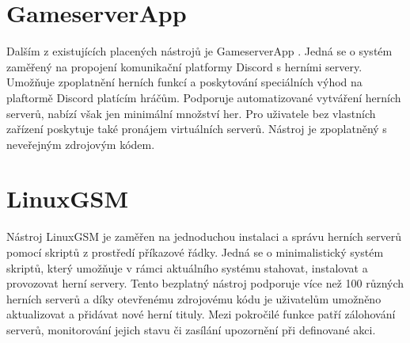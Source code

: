 \section{GameserverApp}

Dalším z existujících placených nástrojů je GameserverApp \cite{gameserverapp}. Jedná se o systém zaměřený na propojení komunikační platformy Discord s herními servery.
Umožňuje zpoplatnění herních funkcí a poskytování speciálních výhod na plaftormě Discord platícím hráčům. Podporuje automatizované vytváření herních serverů, nabízí však jen
minimální množství her. Pro uživatele bez vlastních zařízení poskytuje také pronájem virtuálních serverů. Nástroj je zpoplatněný s neveřejným zdrojovým kódem.

\section{LinuxGSM}

Nástroj LinuxGSM \cite{linuxgsm} je zaměřen na jednoduchou instalaci a správu herních serverů pomocí skriptů z prostředí příkazové řádky.
Jedná se o minimalistický systém skriptů, který umožňuje v rámci aktuálního systému stahovat, instalovat a provozovat herní servery.
Tento bezplatný nástroj podporuje více než 100 různých herních serverů a díky otevřenému zdrojovému kódu je uživatelům umožněno aktualizovat
a přidávat nové herní tituly. Mezi pokročilé funkce patří zálohování serverů, monitorování jejich stavu či zasílání upozornění při definované akci.
